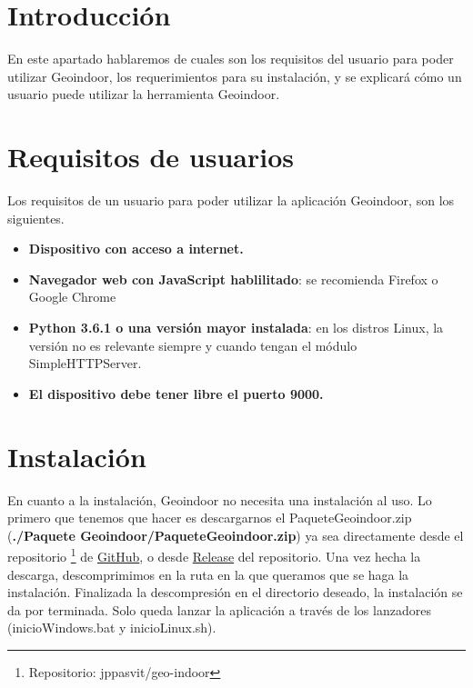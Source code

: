 
\section{Introducción}

En este apartado hablaremos de cuales son los requisitos del usuario para poder utilizar Geoindoor, los requerimientos para su instalación, y se explicará cómo un usuario puede utilizar la herramienta Geoindoor. 

\section{Requisitos de usuarios}

Los requisitos de un usuario para poder utilizar la aplicación Geoindoor, son los siguientes.

\begin{itemize}
	\item \textbf{Dispositivo con acceso a internet.}
	\item \textbf{Navegador web con JavaScript hablilitado}: se recomienda Firefox o Google Chrome
	\item \textbf{Python 3.6.1 o una versión mayor instalada}: en los distros Linux, la versión no es relevante siempre y cuando tengan el módulo SimpleHTTPServer.
	\item \textbf{El dispositivo debe tener libre el puerto 9000.}
\end{itemize}

\section{Instalación}


En cuanto a la instalación, Geoindoor no necesita una instalación al uso. Lo primero que tenemos que hacer es descargarnos el PaqueteGeoindoor.zip (\textbf{./Paquete Geoindoor/PaqueteGeoindoor.zip}) ya sea directamente desde el repositorio \footnote{Repositorio: jppasvit/geo-indoor} de \href{https://github.com/jppasvit/geo-indoor/tree/master/Paquete\%20Geoindoor}{GitHub}, o desde \href{https://github.com/jppasvit/geo-indoor/releases}{Release} del repositorio. Una vez hecha la descarga, descomprimimos en la ruta en la que queramos que se haga la instalación. Finalizada la descompresión en el directorio deseado, la instalación se da por terminada. Solo queda lanzar la aplicación a través de los lanzadores (inicioWindows.bat y inicioLinux.sh).

